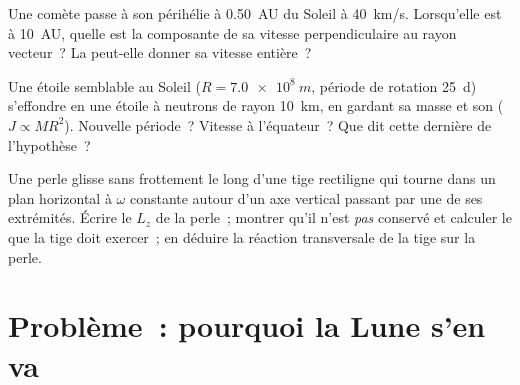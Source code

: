 \begin{exercise}[$\star\star\star$]\label{exo:b1:angular-momentum:10}
Une comète passe à son périhélie à \qty{0.50}{AU} du Soleil à
\qty{40}{km/s}. Lorsqu'elle est à \qty{10}{AU}, quelle est la composante
de sa vitesse perpendiculaire au rayon vecteur~? La 
peut-elle donner sa vitesse entière~?
\end{exercise}

\begin{exercise}[$\star\star\star$]\label{exo:b1:angular-momentum:11}
Une étoile semblable au Soleil ($R = \qty{7.0e8}{m}$, période de rotation
\qty{25}{d}) s'effondre en une étoile à neutrons de rayon \qty{10}{km},
en gardant sa masse et son  ($J \propto MR^2$). Nouvelle
période~? Vitesse à l'équateur~? Que dit cette dernière de l'hypothèse~?
\end{exercise}

\begin{exercise}[$\star\star\star$]\label{exo:b1:angular-momentum:12}
Une perle glisse sans frottement le long d'une tige rectiligne qui
tourne dans un plan horizontal à $\omega$ constante autour d'un axe
vertical passant par une de ses extrémités. Écrire le $L_z$ de la
perle~; montrer qu'il n'est \emph{pas} conservé et calculer le  que
la tige doit exercer~; en déduire la réaction transversale de la tige
sur la perle.
\end{exercise}

\section{Problème~: pourquoi la Lune s'en va}

